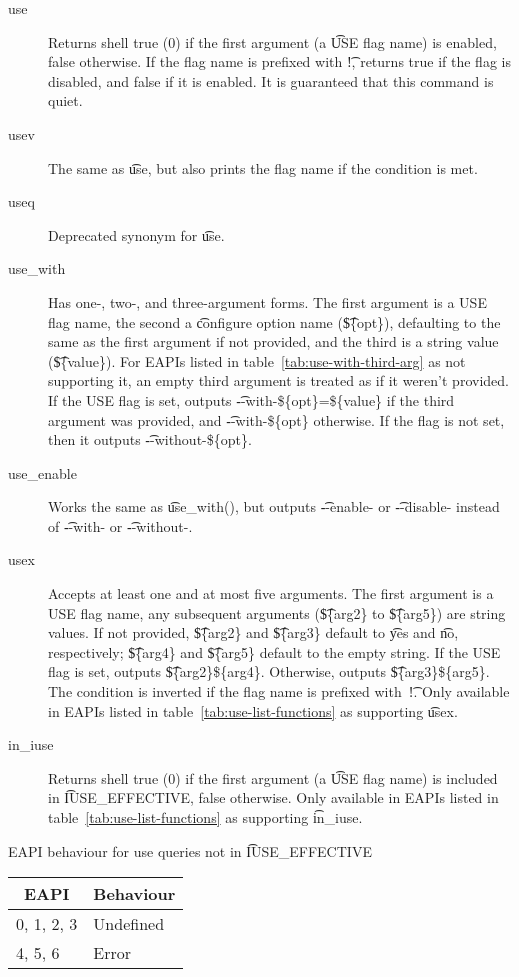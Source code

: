 \begin{description}
\item[use] Returns shell true (0) if the first argument (a \t{USE} flag name) is enabled, false
    otherwise.  If the flag name is prefixed with \t{!}, returns true if the flag is disabled, and
    false if it is enabled. It is guaranteed that this command is quiet.
\item[usev] The same as \t{use}, but also prints the flag name if the condition
    is met.
\item[useq] Deprecated synonym for \t{use}.
\item[use_with]  Has one-, two-, and three-argument forms. The first
    argument is a USE flag name, the second a \t{configure} option name (\t{\$\{opt\}}), defaulting
    to the same as the first argument if not provided, and the third is a string value
    (\t{\$\{value\}}). For EAPIs listed in table~\ref{tab:use-with-third-arg} as not supporting it,
    an empty third argument is treated as if it weren't provided. If the USE flag is set, outputs
    \t{-{}-with-\$\{opt\}=\$\{value\}} if the third argument was provided, and
    \t{-{}-with-\$\{opt\}} otherwise. If the flag is not set, then it outputs
    \t{-{}-without-\$\{opt\}}.
\item[use_enable] Works the same as \t{use_with()}, but outputs \t{-{}-enable-} or
    \t{-{}-disable-} instead of \t{-{}-with-} or \t{-{}-without-}.
\item[usex]  Accepts at least one and at most five arguments. The first argument
    is a USE flag name, any subsequent arguments (\t{\$\{arg2\}} to \t{\$\{arg5\}}) are string
    values. If not provided, \t{\$\{arg2\}} and \t{\$\{arg3\}} default to \t{yes} and \t{no},
    respectively; \t{\$\{arg4\}} and \t{\$\{arg5\}} default to the empty string. If the USE flag is
    set, outputs \t{\$\{arg2\}\$\{arg4\}}. Otherwise, outputs \t{\$\{arg3\}\$\{arg5\}}.
    The condition is inverted if the flag name is prefixed with~\t{!}.
    Only available in EAPIs listed in table~\ref{tab:use-list-functions} as supporting \t{usex}.
\item[in_iuse]  Returns shell true (0) if the first argument (a \t{USE} flag
    name) is included in \t{IUSE_EFFECTIVE}, false otherwise. Only available in EAPIs listed in
    table~\ref{tab:use-list-functions} as supporting \t{in_iuse}.
\end{description}

\begin{centertable}{EAPI behaviour for use queries not in \t{IUSE_EFFECTIVE}}
    \label{tab:use-list-strictness}
    \begin{tabular}{ll}
      \toprule
      \multicolumn{1}{c}{\textbf{EAPI}} &
      \multicolumn{1}{c}{\textbf{Behaviour}} \\
      \midrule
      0, 1, 2, 3        & Undefined \\
      4, 5, 6           & Error     \\
      \bottomrule
    \end{tabular}
\end{centertable}

